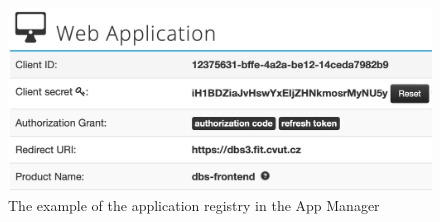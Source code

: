 \begin{figure}[hp]
\centering
\includegraphics[scale=0.54]{../png/app_manager.png}
\caption{The example of the application registry in the App Manager}
\end{figure}









